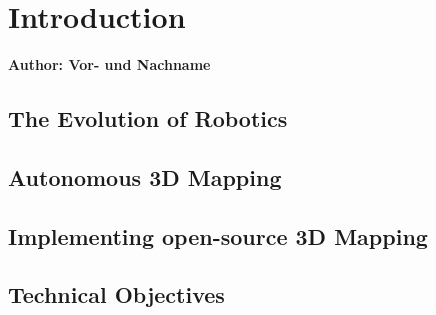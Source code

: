 \chapter{Introduction}

\textbf{Author: Vor- und Nachname}

\vspace{2mm}

\section{The Evolution of Robotics}

\section{Autonomous 3D Mapping}

\section{Implementing open-source 3D Mapping}

\section{Technical Objectives}

\filbreak
